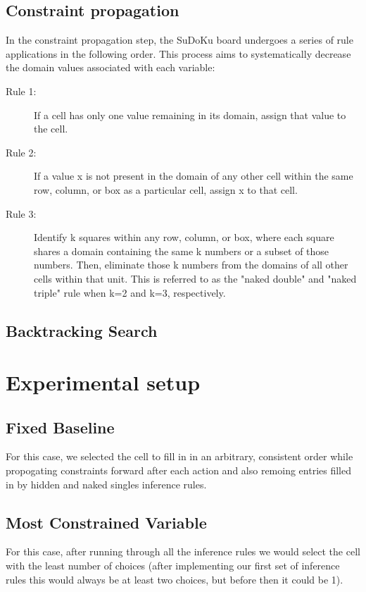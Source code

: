 \documentclass{article}
\begin{document}
\subsection{Constraint propagation}
In the constraint propagation step, the SuDoKu board undergoes a series of rule applications in the following order. This process aims to systematically decrease the domain values associated with each variable:
\begin{description}
  \item[Rule 1:] If a cell has only one value remaining in its domain, assign that value to the cell.
  \item[Rule 2:] If a value x is not present in the domain of any other cell within the same row, column, or box as a particular cell, assign x to that cell.
  \item[Rule 3:] Identify k squares within any row, column, or box, where each square shares a domain containing the same k numbers or a subset of those numbers. Then, eliminate those k numbers from the domains of all other cells within that unit. This is referred to as the "naked double" and "naked triple" rule when k=2 and k=3, respectively.
\end{description}


\label{alg:Constraint Propagation}
 
 
 
   
   
 
 

\subsection{Backtracking Search}
  
\label{alg:Backtracking Search}
 

\section{Experimental setup}
\subsection{Fixed  Baseline}
For this case, we selected the  cell to fill in in an arbitrary, consistent order while propogating constraints forward after each action and also remoing entries filled in by hidden and naked singles inference rules. 
\subsection{Most Constrained Variable}
For this case, after running through all the inference rules we would select the cell with the least number of choices (after implementing our first set of inference rules this would always be at least two choices, but before then it could be 1). 
\end{document}
